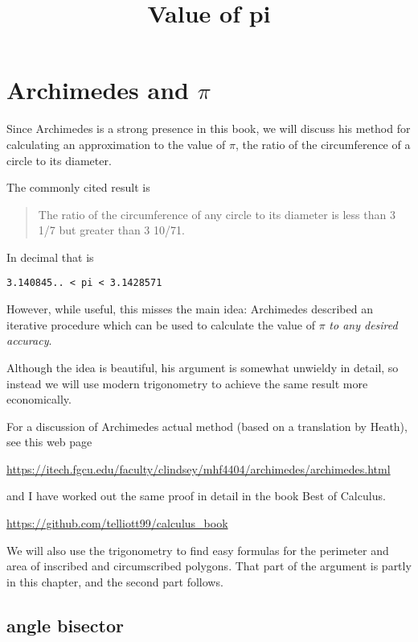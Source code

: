 \documentclass[11pt, oneside]{article}
\title{Value of pi}
\date{}
\begin{document}
\maketitle
\Large


\label{sec:Value_of_pi}

\section*{Archimedes and $\pi$}
Since Archimedes is a strong presence in this book, we will discuss his method for calculating an approximation to the value of $\pi$, the ratio of the circumference of a circle to its diameter.  

The commonly cited result is 

\begin{quote}The ratio of the circumference of any circle to its diameter is less than 3 1/7 but greater than 3 10/71.\end{quote}

In decimal that is

\begin{verbatim}
3.140845.. < pi < 3.1428571
\end{verbatim}

However, while useful, this misses the main idea:  Archimedes described an iterative procedure which can be used to calculate the value of $\pi$ \emph{to any desired accuracy}.

Although the idea is beautiful, his argument is somewhat unwieldy in detail, so instead we will use modern trigonometry to achieve the same result more economically.  

For a discussion of Archimedes actual method (based on a translation by Heath), see this web page

\url{https://itech.fgcu.edu/faculty/clindsey/mhf4404/archimedes/archimedes.html}

and I have worked out the same proof in detail in the book Best of Calculus.

\url{https://github.com/telliott99/calculus_book}

We will also use the trigonometry to find easy formulas for the perimeter and area of inscribed and circumscribed polygons.  That part of the argument is partly in this chapter, and the second part follows.

\subsection*{angle bisector}
\end{document}

